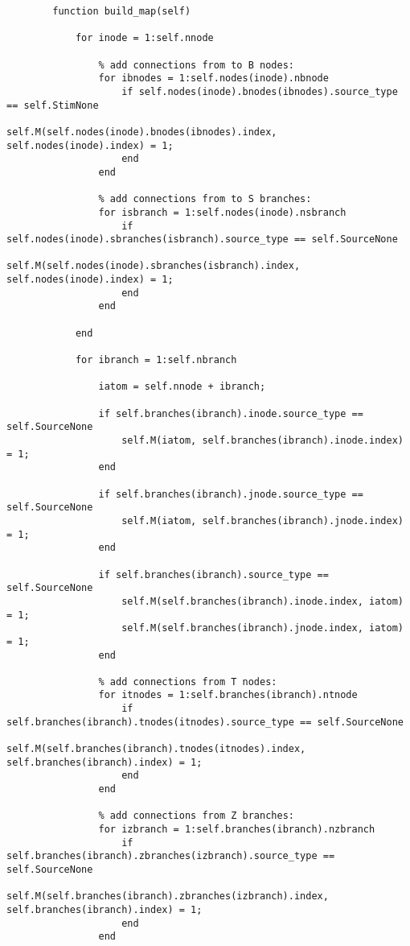 \begin{lstlisting}
        function build_map(self)
            
            for inode = 1:self.nnode
                
                % add connections from to B nodes:
                for ibnodes = 1:self.nodes(inode).nbnode
                    if self.nodes(inode).bnodes(ibnodes).source_type == self.StimNone
                        self.M(self.nodes(inode).bnodes(ibnodes).index, self.nodes(inode).index) = 1;
                    end
                end
                
                % add connections from to S branches:
                for isbranch = 1:self.nodes(inode).nsbranch
                    if self.nodes(inode).sbranches(isbranch).source_type == self.SourceNone
                        self.M(self.nodes(inode).sbranches(isbranch).index, self.nodes(inode).index) = 1;
                    end
                end
                
            end
            
            for ibranch = 1:self.nbranch
                
                iatom = self.nnode + ibranch;
                
                if self.branches(ibranch).inode.source_type == self.SourceNone
                    self.M(iatom, self.branches(ibranch).inode.index) = 1;
                end
                
                if self.branches(ibranch).jnode.source_type == self.SourceNone
                    self.M(iatom, self.branches(ibranch).jnode.index) = 1;
                end
                
                if self.branches(ibranch).source_type == self.SourceNone
                    self.M(self.branches(ibranch).inode.index, iatom) = 1;
                    self.M(self.branches(ibranch).jnode.index, iatom) = 1;
                end
                
                % add connections from T nodes:
                for itnodes = 1:self.branches(ibranch).ntnode
                    if self.branches(ibranch).tnodes(itnodes).source_type == self.SourceNone
                        self.M(self.branches(ibranch).tnodes(itnodes).index, self.branches(ibranch).index) = 1;
                    end
                end
                
                % add connections from Z branches:
                for izbranch = 1:self.branches(ibranch).nzbranch
                    if self.branches(ibranch).zbranches(izbranch).source_type == self.SourceNone
                        self.M(self.branches(ibranch).zbranches(izbranch).index, self.branches(ibranch).index) = 1;
                    end
                end
                

\end{lstlisting}
